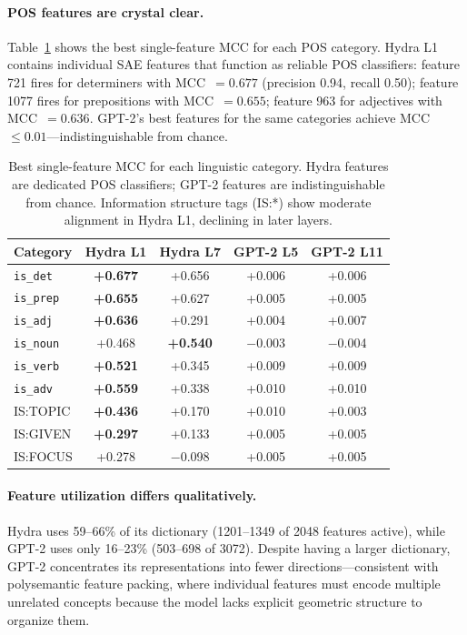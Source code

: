 \documentclass[11pt]{article}
\begin{document}
\paragraph{POS features are crystal clear.}
Table~\ref{tab:sae-pos} shows the best single-feature MCC for each POS 
category. Hydra L1 contains individual SAE features that function as 
reliable POS classifiers: feature 721 fires for determiners with 
MCC~$= 0.677$ (precision 0.94, recall 0.50); feature 1077 fires for 
prepositions with MCC~$= 0.655$; feature 963 for adjectives with 
MCC~$= 0.636$. GPT-2's best features for the same categories achieve 
MCC~$\leq 0.01$---indistinguishable from chance.

\begin{table}[t]
\centering
\small
\begin{tabular}{@{}lcccc@{}}
\toprule
\textbf{Category} & \textbf{Hydra L1} & \textbf{Hydra L7} & \textbf{GPT-2 L5} & \textbf{GPT-2 L11} \\
\midrule
\texttt{is\_det}  & \textbf{+0.677} & +0.656 & +0.006 & +0.006 \\
\texttt{is\_prep} & \textbf{+0.655} & +0.627 & +0.005 & +0.005 \\
\texttt{is\_adj}  & \textbf{+0.636} & +0.291 & +0.004 & +0.007 \\
\texttt{is\_noun} & +0.468 & \textbf{+0.540} & $-$0.003 & $-$0.004 \\
\texttt{is\_verb} & \textbf{+0.521} & +0.345 & +0.009 & +0.009 \\
\texttt{is\_adv}  & \textbf{+0.559} & +0.338 & +0.010 & +0.010 \\
\midrule
IS:TOPIC & \textbf{+0.436} & +0.170 & +0.010 & +0.003 \\
IS:GIVEN & \textbf{+0.297} & +0.133 & +0.005 & +0.005 \\
IS:FOCUS & +0.278 & $-$0.098 & +0.005 & +0.005 \\
\bottomrule
\end{tabular}
\caption{Best single-feature MCC for each linguistic category. Hydra 
features are dedicated POS classifiers; GPT-2 features are 
indistinguishable from chance. Information structure tags (IS:*) show 
moderate alignment in Hydra L1, declining in later layers.}
\label{tab:sae-pos}
\end{table}

\paragraph{Feature utilization differs qualitatively.}
Hydra uses 59--66\% of its dictionary (1201--1349 of 2048 features active), 
while GPT-2 uses only 16--23\% (503--698 of 3072). Despite having a larger 
dictionary, GPT-2 concentrates its representations into fewer directions---consistent 
with polysemantic feature packing, where individual features must encode 
multiple unrelated concepts because the model lacks explicit geometric 
structure to organize them.
\end{document}
